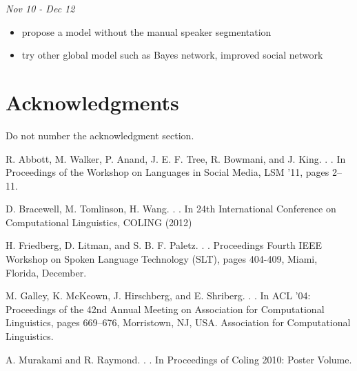 \documentclass[11pt,letterpaper]{article}
\begin{document}
\noindent \emph{Nov 10 - Dec 12}
\begin{itemize}
  \item propose a model without the manual speaker segmentation
  \item try other global model such as Bayes network, improved social network
\end{itemize}

\section*{Acknowledgments}

Do not number the acknowledgment section.

\begin{thebibliography}{}
R. Abbott, M. Walker, P. Anand, J. E. F. Tree, R. Bowmani, and J. King.
. 
. 
\newblock In Proceedings of the Workshop on Languages in Social Media, LSM ’11, pages 2–11.

D. Bracewell, M. Tomlinson, H. Wang.
. 
. 
\newblock In 24th International Conference on Computational Linguistics, COLING (2012)

H. Friedberg, D. Litman, and S. B. F. Paletz.
. 
. 
\newblock Proceedings Fourth IEEE Workshop on Spoken Language Technology (SLT), pages 404-409, Miami, Florida, December.

M. Galley, K. McKeown, J. Hirschberg, and E. Shriberg.
. 
. 
\newblock In ACL ’04: Proceedings of the 42nd Annual Meeting on Association for Computational Linguistics, pages 669–676, Morristown, NJ, USA. Association for Computational Linguistics.

A. Murakami and R. Raymond.
. 
. 
\newblock In Proceedings of Coling 2010: Poster Volume.


\end{thebibliography}
\end{document}

